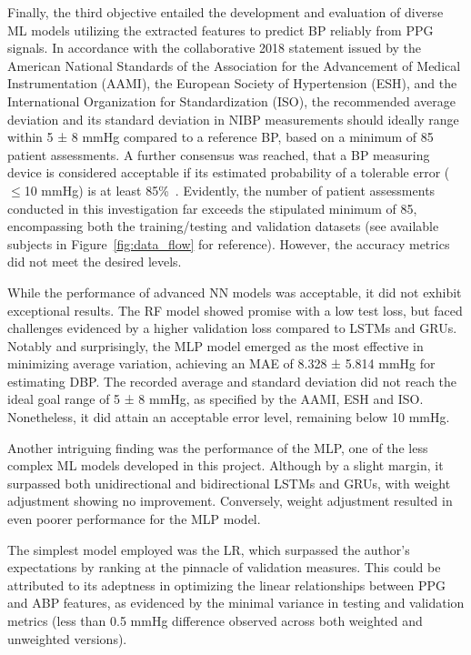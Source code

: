 Finally, the third objective entailed the development and evaluation of diverse ML models utilizing the extracted features to predict BP reliably from PPG signals.
In accordance with the collaborative 2018 statement issued by the American National Standards of the Association for the Advancement of Medical Instrumentation (AAMI), the European Society of Hypertension (ESH), and the International Organization for Standardization (ISO),
the recommended average deviation and its standard deviation in NIBP measurements should ideally range within 5 ± 8 mmHg compared to a reference BP, based on a minimum of 85 patient assessments.
A further consensus was reached, that a BP measuring device is considered acceptable if its estimated probability of a tolerable error ($\leq$10 mmHg) is at least 85\%~\cite{stergiouUniversalStandardValidation2018}.
Evidently, the number of patient assessments conducted in this investigation far exceeds the stipulated minimum of 85, encompassing both the training/testing and validation datasets (see available subjects in Figure~\ref{fig:data_flow} for reference).
However, the accuracy metrics did not meet the desired levels.

While the performance of advanced NN models was acceptable, it did not exhibit exceptional results.
The RF model showed promise with a low test loss, but faced challenges evidenced by a higher validation loss compared to LSTMs and GRUs.
Notably and surprisingly, the MLP model emerged as the most effective in minimizing average variation, achieving an MAE of 8.328 ± 5.814 mmHg for estimating DBP\@.
The recorded average and standard deviation did not reach the ideal goal range of 5 ± 8 mmHg, as specified by the AAMI, ESH and ISO\@.
Nonetheless, it did attain an acceptable error level, remaining below 10 mmHg.

Another intriguing finding was the performance of the MLP, one of the less complex ML models developed in this project.
Although by a slight margin, it surpassed both unidirectional and bidirectional LSTMs and GRUs, with weight adjustment showing no improvement.
Conversely, weight adjustment resulted in even poorer performance for the MLP model.

The simplest model employed was the LR, which surpassed the author's expectations by ranking at the pinnacle of validation measures.
This could be attributed to its adeptness in optimizing the linear relationships between PPG and ABP features,
as evidenced by the minimal variance in testing and validation metrics (less than 0.5 mmHg difference observed across both weighted and unweighted versions).

